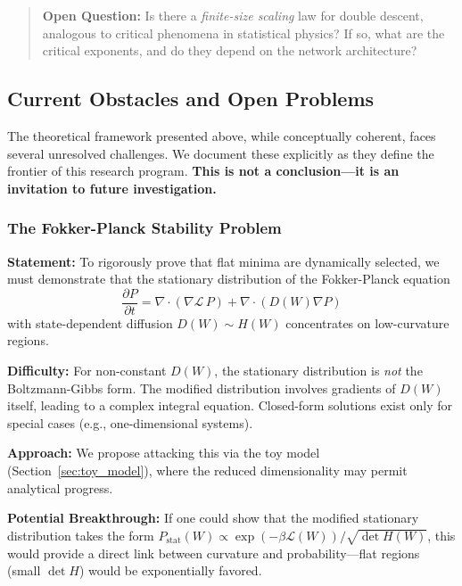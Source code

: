 \documentclass[
  journal=largetwo,
  simfonts=false,
  year=2025,
  volume=37,
]{cup-journal}
\begin{document}
\begin{quote}
\textbf{Open Question:} Is there a \textit{finite-size scaling} law for double descent, analogous to critical phenomena in statistical physics? If so, what are the critical exponents, and do they depend on the network architecture?
\end{quote}

\subsection{Current Obstacles and Open Problems}\label{sec:open_problems}

The theoretical framework presented above, while conceptually coherent, faces several unresolved challenges. We document these explicitly as they define the frontier of this research program. \textbf{This is not a conclusion---it is an invitation to future investigation.}

\subsubsection{The Fokker-Planck Stability Problem}

\textbf{Statement:} To rigorously prove that flat minima are dynamically selected, we must demonstrate that the stationary distribution of the Fokker-Planck equation
\begin{equation}
    \frac{\partial P}{\partial t} = \nabla \cdot \left( \nabla \mathcal{L} \, P \right) + \nabla \cdot \left( D(W) \nabla P \right)
\end{equation}
with state-dependent diffusion $D(W) \sim H(W)$ concentrates on low-curvature regions.

\textbf{Difficulty:} For non-constant $D(W)$, the stationary distribution is \textit{not} the Boltzmann-Gibbs form. The modified distribution involves gradients of $D(W)$ itself, leading to a complex integral equation. Closed-form solutions exist only for special cases (e.g., one-dimensional systems).

\textbf{Approach:} We propose attacking this via the toy model (Section~\ref{sec:toy_model}), where the reduced dimensionality may permit analytical progress.

\textbf{Potential Breakthrough:} If one could show that the modified stationary distribution takes the form $P_{\text{stat}}(W) \propto \exp(-\beta \mathcal{L}(W)) / \sqrt{\det H(W)}$, this would provide a direct link between curvature and probability---flat regions (small $\det H$) would be exponentially favored.
\end{document}
